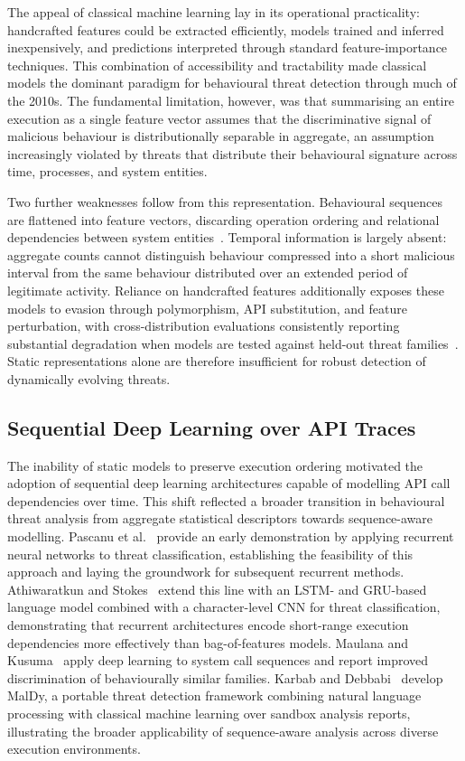 \documentclass[%
    BCOR=10mm,
    DIV=13,
    toc=bibliography,
    toc=listof,
    oneside,
    12pt,
]{scrbook}
\begin{document}
The appeal of classical machine learning lay in its operational practicality:
handcrafted features could be extracted efficiently, models trained and
inferred inexpensively, and predictions interpreted through standard
feature-importance techniques. This combination of accessibility and
tractability made classical models the dominant paradigm for behavioural threat
detection through much of the 2010s. The fundamental limitation, however, was
that summarising an entire execution as a single feature vector assumes that
the discriminative signal of malicious behaviour is distributionally separable
in aggregate, an assumption increasingly violated by threats that distribute
their behavioural signature across time, processes, and system entities.

Two further weaknesses follow from this representation. Behavioural sequences
are flattened into feature vectors, discarding operation ordering and
relational dependencies between system entities~\cite{ucci2019survey,
bilot2024survey}. Temporal information is largely absent: aggregate counts
cannot distinguish behaviour compressed into a short malicious interval from
the same behaviour distributed over an extended period of legitimate activity.
Reliance on handcrafted features additionally exposes these models to evasion
through polymorphism, API substitution, and feature perturbation, with
cross-distribution evaluations consistently reporting substantial degradation
when models are tested against held-out threat families~\cite{guo2023zeroday}.
Static representations alone are therefore insufficient for robust detection of
dynamically evolving threats.

\subsection{Sequential Deep Learning over API Traces}
\label{subsec:sequential_dl}

The inability of static models to preserve execution ordering motivated the
adoption of sequential deep learning architectures capable of modelling API
call dependencies over time. This shift reflected a broader transition in
behavioural threat analysis from aggregate statistical descriptors towards
sequence-aware modelling. Pascanu et al.~\cite{pascanu2015} provide an early
demonstration by applying recurrent neural networks to threat classification,
establishing the feasibility of this approach and laying the groundwork for
subsequent recurrent methods.
Athiwaratkun and Stokes~\cite{athiwaratkun2017} extend this line with an LSTM-
and GRU-based language model combined with a character-level CNN for threat
classification, demonstrating that recurrent architectures encode short-range
execution dependencies more effectively than bag-of-features models. Maulana and
Kusuma~\cite{nguyen2023} apply deep learning to system call sequences and report
improved discrimination of behaviourally similar families. Karbab and
Debbabi~\cite{karbab2019} develop MalDy, a portable threat detection framework
combining natural language processing with classical machine learning over
sandbox analysis reports, illustrating the broader applicability of
sequence-aware analysis across diverse execution environments.
\end{document}

